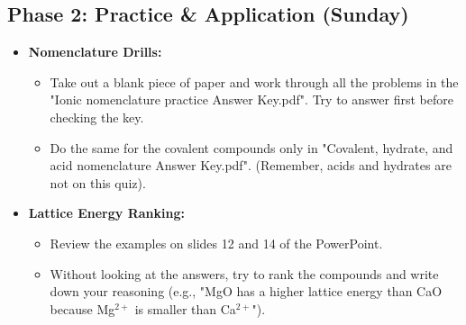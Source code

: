 \documentclass{article}
\begin{document}
\bigskip
\subsection*{Phase 2: Practice \& Application (Sunday)}
\begin{itemize}[itemsep=5pt]
    \item \textbf{Nomenclature Drills:}
    \begin{itemize}
        \item Take out a blank piece of paper and work through all the problems in the "Ionic nomenclature practice Answer Key.pdf". Try to answer first before checking the key.
        \item Do the same for the covalent compounds only in "Covalent, hydrate, and acid nomenclature Answer Key.pdf". (Remember, acids and hydrates are not on this quiz).
    \end{itemize}
    \item \textbf{Lattice Energy Ranking:}
    \begin{itemize}
        \item Review the examples on slides 12 and 14 of the PowerPoint.
        \item Without looking at the answers, try to rank the compounds and write down your reasoning (e.g., "MgO has a higher lattice energy than CaO because Mg$^{2+}$ is smaller than Ca$^{2+}$").
    \end{itemize}
\end{itemize}

\bigskip
\end{document}
